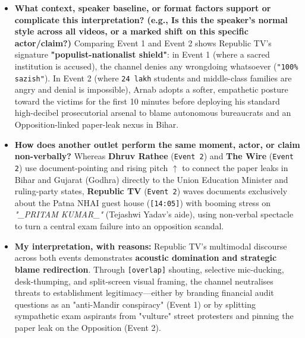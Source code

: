 \documentclass[10pt,a4paper]{article}
\begin{document}
\begin{itemize}
His non-verbal cues \textbf{dramatise bureaucratic failure} (pen-jabbing on \textit{"NTA babus"}), \textbf{soften central government culpability} (calm, reassuring nods when mentioning the CBI probe at \texttt{[16:22]}), \textbf{invert street protests via visual pointing} (pointing at party flags to rebrand protesters as \textit{"Congress cadres"} at \texttt{[20:25]}), and \textbf{implicate the Opposition via dramatic \texttt{(1.5)} pauses and trailing off} (\texttt{...} at \texttt{[14:48]}).\par\smallskip
  \item \textbf{What context, speaker baseline, or format factors support or complicate this interpretation? (e.g., Is this the speaker's normal style across all videos, or a marked shift on this specific actor/claim?)}
Comparing Event 1 and Event 2 shows Republic TV's signature \textbf{"populist-nationalist shield"}: in Event 1 (where a sacred institution is accused), the channel denies any wrongdoing whatsoever (\texttt{"100\% sazish"}). In Event 2 (where \texttt{24 lakh} students and middle-class families are angry and denial is impossible), Arnab adopts a softer, empathetic posture toward the victims for the first 10 minutes before deploying his standard high-decibel prosecutorial arsenal to blame autonomous bureaucrats and an Opposition-linked paper-leak nexus in Bihar.\par\smallskip
  \item \textbf{How does another outlet perform the same moment, actor, or claim non-verbally?}
Whereas \textbf{Dhruv Rathee} (\texttt{Event 2}) and \textbf{The Wire} (\texttt{Event 2}) use document-pointing and rising pitch \texttt{$\uparrow$} to connect the paper leaks in Bihar and Gujarat (Godhra) directly to the Union Education Minister and ruling-party states, \textbf{Republic TV} (\texttt{Event 2}) waves documents exclusively about the Patna NHAI guest house (\texttt{[14:05]}) with booming stress on \textit{"\_PRITAM KUMAR\_"} (Tejashwi Yadav's aide), using non-verbal spectacle to turn a central exam failure into an opposition scandal.\par\smallskip
  \item \textbf{My interpretation, with reasons:}
Republic TV's multimodal discourse across both events demonstrates \textbf{acoustic domination and strategic blame redirection}. Through \texttt{[overlap]} shouting, selective mic-ducking, desk-thumping, and split-screen visual framing, the channel neutralises threats to establishment legitimacy---either by branding financial audit questions as an "anti-Mandir conspiracy" (Event 1) or by splitting sympathetic exam aspirants from "vulture" street protesters and pinning the paper leak on the Opposition (Event 2).\par\smallskip
\end{itemize}
\end{document}
